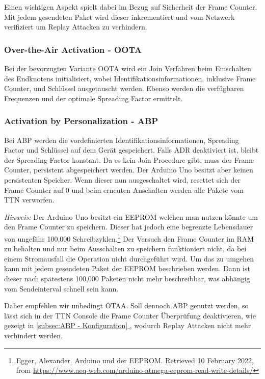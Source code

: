 \documentclass[12pt]{article}
\newcommand*{\fullref}[1]{\hyperref[{#1}]{\ref{#1} \nameref{#1}}}   %
\begin{document}
      Einen wichtigen Aspekt spielt dabei im Bezug auf Sicherheit der Frame Counter. Mit jedem gesendeten Paket wird dieser inkrementiert
      und vom Netzwerk verifiziert um Replay Attacken zu verhindern.

      \subsubsection{Over-the-Air Activation - OOTA}
        Bei der bevorzugten Variante OOTA wird ein Join Verfahren beim Einschalten des Endknotens initialisiert,
        wobei Identifikationsinformationen, inklusive Frame Counter, und Schlüssel ausgetauscht werden. Ebenso werden die verfügbaren Frequenzen und
        der optimale Spreading Factor ermittelt.

      \subsubsection{Activation by Personalization - ABP}
        Bei ABP werden die vordefinierten Identifikationsinformationen, Spreading Factor und Schlüssel auf dem Gerät gespeichert.
        Falls ADR deaktiviert ist, bleibt der Spreading Factor konstant. Da es kein Join Procedure gibt, muss der Frame Counter,
        persistent abgespeichert werden. Der Arduino Uno besitzt aber keinen persistenten Speicher. Wenn dieser nun ausgeschaltet wird, resettet sich der Frame
        Counter auf 0 und beim erneuten Anschalten werden alle Pakete vom TTN verworfen. 

        \textit{Hinweis:} Der Arduino Uno besitzt ein EEPROM welchen man nutzen könnte um den Frame Counter zu speichern. Dieser hat jedoch eine begrenzte
        Lebensdauer von ungefähr 100,000 Schreibzyklen.\footnote[2]{Egger, Alexander. Arduino und der EEPROM. Retrieved 10 February 2022, from \href{https://www.aeq-web.com/arduino-atmega-eeprom-read-write-details/}{https://www.aeq-web.com/arduino-atmega-eeprom-read-write-details/}}
        Der Versuch den Frame Counter im RAM zu behalten und nur beim Ausschalten zu speichern funktioniert nicht, da bei einem Stromausfall
        die Operation nicht durchgeführt wird. Um das zu umgehen kann mit jedem gesendeten Paket der EEPROM beschrieben werden. Dann ist dieser nach
        spätestens 100,000 Paketen nicht mehr beschreibbar, was abhängig vom Sendeinterval schnell sein kann.

        Daher empfehlen wir unbedingt OTAA. Soll dennoch ABP genutzt werden, so lässt sich in der TTN Console die Frame Counter Überprüfung deaktivieren,
        wie gezeigt in \underline{\fullref{subsec:ABP - Konfiguration}}, wodurch Replay Attacken nicht mehr verhindert werden.
\end{document}
